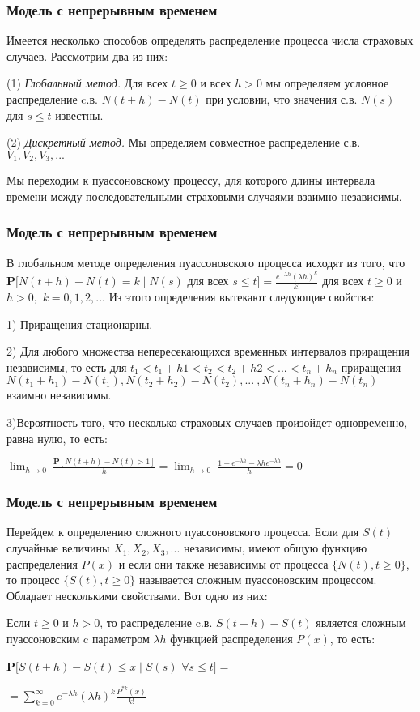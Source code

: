 \documentclass[12pt]{beamer}
\begin{document}
\begin{frame}
\frametitle{Модель с непрерывным временем} 
Имеется несколько способов определять распределение процесса числа страховых случаев. 
Рассмотрим два из них:

(1) \textit{Глобальный метод.} Для всех $t\geq 0$ и всех $h>0$ мы определяем условное распределение c.в. $N(t + h) - N(t)$ при условии, что значения с.в. $N(s)$ для $s \leq t$ известны.

(2) \textit{Дискретный метод.} Мы определяем совместное распределение с.в. $V_{1}, V_{2}, V_{3}, ...$

\setlength{\parskip}{2.5em}
Мы переходим к пуассоновскому процессу, для которого длины интервала времени между последовательными страховыми случаями взаимно независимы.
\end{frame}

\setlength{\parskip}{0.5em}

\begin{frame}
\frametitle{Модель с непрерывным временем} 
В глобальном методе определения пуассоновского процесса исходят из того, что $\textbf{P}[N(t+h)-N(t)=k \mid N(s)$ для всех $s \leq t] = \frac{e^{- \lambda h}(\lambda h)^{k}}{k!}$ для всех $t\geq 0$ и $h>0 ,$  $k = 0, 1, 2, ...$
Из этого определения вытекают следующие свойства:

1) Приращения стационарны.

2) Для любого множества непересекающихся временных интервалов приращения независимы, то есть для $t_{1}<t_{1}+h{1}<t_{2}<t_{2}+h{2}<...<t_{n}+h_{n}$ приращения $N(t_{1}+h_{1})-N(t_{1}), N(t_{2}+h_{2})-N(t_{2}),...\:,N(t_{n}+h_{n})-N(t_{n})$ взаимно независимы.

3)Вероятность того, что несколько страховых случаев произойдет одновременно, равна нулю, то есть:

$ \lim_{h \rightarrow 0} \: \frac{\textbf{P}[N(t+h)-N(t)>1]}{h} = \lim_{h \rightarrow 0} \: \frac{1-e^{- \lambda h}- \lambda he^{- \lambda h}}{h} = 0$
\end{frame}

\begin{frame}
\frametitle{Модель с непрерывным временем} 

Перейдем к определению сложного пуассоновского процесса. Если для $S(t)$ случайные величины $X_{1}, X_{2}, X_{3}, ...$ независимы, имеют общую функцию распределения $P(x)$ и если они также независимы от процесса $\big\{N(t), t\geq 0\big\}$, то процесс $\big\{S(t), t\geq 0\big\}$ называется сложным пуассоновским процессом. Обладает несколькими свойствами. Вот одно из них:

Если $t\geq 0 $ и $h > 0$, то распределение c.в. $S(t + h) - S(t)$ является сложным пуассоновским c параметром $\lambda h$ функцией распределения $P(x)$, то есть:
\setlength{\parindent}{0ex}

$\textbf{P}[S(t+h)-S(t)\leq x \mid S(s)$  $\forall s \leq t] = $ 

$= \sum_{k=0}^{ \infty }e^{- \lambda h}(\lambda h)^{k} \frac{P^{\ast k}(x) }{k!}$
\end{frame}
\end{document}
